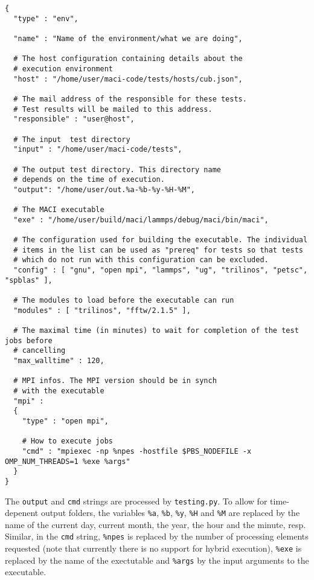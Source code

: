 \begin{lstlisting}[style=SHELL_SMALL,frame=lines]
{
  "type" : "env",
  
  "name" : "Name of the environment/what we are doing",

  # The host configuration containing details about the
  # execution environment
  "host" : "/home/user/maci-code/tests/hosts/cub.json",

  # The mail address of the responsible for these tests.
  # Test results will be mailed to this address.
  "responsible" : "user@host",

  # The input  test directory
  "input" : "/home/user/maci-code/tests",
	
  # The output test directory. This directory name
  # depends on the time of execution.
  "output": "/home/user/out.%a-%b-%y-%H-%M",

  # The MACI executable
  "exe" : "/home/user/build/maci/lammps/debug/maci/bin/maci",

  # The configuration used for building the executable. The individual
  # items in the list can be used as "prereq" for tests so that tests
  # which do not run with this configuration can be excluded.
  "config" : [ "gnu", "open mpi", "lammps", "ug", "trilinos", "petsc", "spblas" ],
	
  # The modules to load before the executable can run
  "modules" : [ "trilinos", "fftw/2.1.5" ],

  # The maximal time (in minutes) to wait for completion of the test jobs before
  # cancelling
  "max_walltime" : 120,

  # MPI infos. The MPI version should be in synch
  # with the executable
  "mpi" :
  {
    "type" : "open mpi",

    # How to execute jobs
    "cmd" : "mpiexec -np %npes -hostfile $PBS_NODEFILE -x OMP_NUM_THREADS=1 %exe %args"
  }
}
\end{lstlisting}

The \lstinline[style=SHELL]|output| and \lstinline[style=SHELL]|cmd| strings are processed by \lstinline[style=SHELL]|testing.py|. To allow for time-depenent output folders, the variables \lstinline[style=SHELL]|%a|, \lstinline[style=SHELL]|%b|, \lstinline[style=SHELL]|%y|, \lstinline[style=SHELL]|%H| and \lstinline[style=SHELL]|%M| are replaced by the name of the current day, current month, the year, the hour and the minute, resp. Similar, in the \MPI \lstinline[style=SHELL]|cmd| string, \lstinline[style=SHELL]|%npes| is replaced by the number of processing elements requested (note that currently there is no support for hybrid execution), \lstinline[style=SHELL]|%exe| is replaced by the name of the exectutable and \lstinline[style=SHELL]|%args| by the input arguments to the executable.

